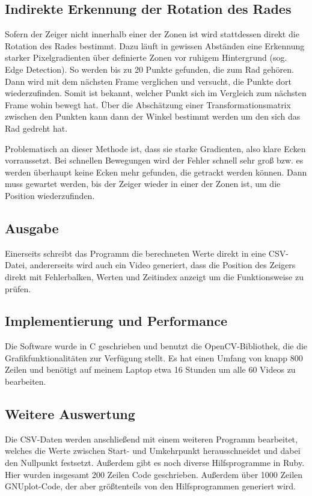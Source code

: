 \documentclass[a4paper,german,12pt,smallheadings]{scrartcl}
\begin{document}
\subsection{Indirekte Erkennung der Rotation des Rades}
Sofern der Zeiger nicht innerhalb einer der Zonen ist wird stattdessen direkt
die Rotation des Rades bestimmt. Dazu läuft in gewissen Abständen eine
Erkennung starker Pixelgradienten über definierte Zonen vor ruhigem Hintergrund
(sog. Edge Detection). So werden bis zu 20 Punkte gefunden, die zum Rad
gehören. Dann wird mit dem nächsten Frame verglichen und versucht, die Punkte
dort wiederzufinden. Somit ist bekannt, welcher Punkt sich im Vergleich zum
nächsten Frame wohin bewegt hat. Über die Abschätzung einer
Transformationsmatrix zwischen den Punkten kann dann der Winkel bestimmt werden
um den sich das Rad gedreht hat.

Problematisch an dieser Methode ist, dass sie starke Gradienten, also klare
Ecken vorraussetzt. Bei schnellen Bewegungen wird der Fehler schnell sehr groß
bzw. es werden überhaupt keine Ecken mehr gefunden, die getrackt werden können.
Dann muss gewartet werden, bis der Zeiger wieder in einer der Zonen ist, um die
Position wiederzufinden.

\subsection{Ausgabe}
Einerseits schreibt das Programm die berechneten Werte direkt in eine CSV-Datei, andererseits wird auch ein Video generiert, dass die Position des Zeigers direkt mit Fehlerbalken, Werten und Zeitindex anzeigt um die Funktionsweise zu prüfen.

\subsection{Implementierung und Performance}
Die Software wurde in C geschrieben und benutzt die OpenCV-Bibliothek, die die
Grafikfunktionalitäten zur Verfügung stellt. Es hat einen Umfang von knapp 800
Zeilen und benötigt auf meinem Laptop etwa 16 Stunden um alle 60 Videos zu
bearbeiten.

\subsection{Weitere Auswertung}
Die CSV-Daten werden anschließend mit einem weiteren Programm bearbeitet,
welches die Werte zwischen Start- und Umkehrpunkt herausschneidet und dabei den
Nullpunkt festsetzt. Außerdem gibt es noch diverse Hilfsprogramme in Ruby. Hier
wurden insgesamt 200 Zeilen Code geschrieben. Außerdem über 1000 Zeilen
GNUplot-Code, der aber größtenteils von den Hilfsprogrammen generiert wird.
\end{document}
